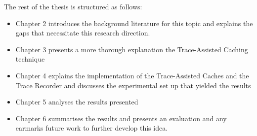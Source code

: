 The rest of the thesis is structured as follows:
\begin{itemize}
	\item Chapter 2 introduces the background literature for this topic and explains the gaps that necessitate this research direction.
	\item Chapter 3 presents a more thorough explanation the Trace-Assisted Caching technique 
	\item Chapter 4 explains the implementation of the Trace-Assisted Caches and the Trace Recorder and discusses the experimental set up that yielded the results
	\item Chapter 5 analyses the results presented
	\item Chapter 6 summarises the results and presents an evaluation and any earmarks future work to further develop this idea.
\end{itemize}
